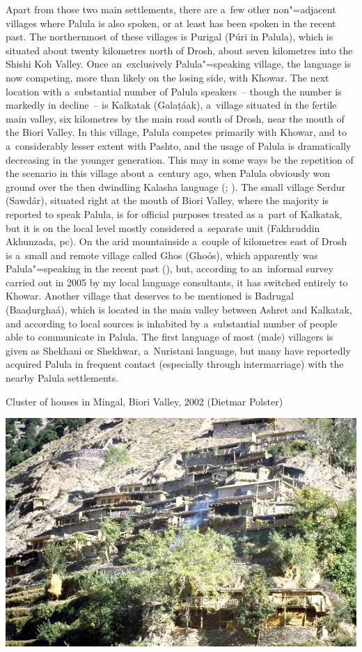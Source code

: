 Apart from those two main settlements, there are a~few other non"=adjacent villages where Palula is also spoken, or at least has been spoken in the recent past. The northernmost of these villages is Purigal (Púri in Palula), which is situated about twenty kilometres north of Drosh, about seven kilometres into the Shishi Koh Valley. Once an~exclusively Palula"=speaking village, the language is now competing, more than likely on the losing side, with Khowar. The next location with a~substantial number of Palula speakers~-- though the number is markedly in decline~-- is Kalkatak (Galaṭáak), a~village situated in the fertile main valley, six kilometres by the main road south of Drosh, near the mouth of the Biori Valley. In this village, Palula competes primarily with Khowar, and to a~considerably lesser extent with Pashto, and the usage of Palula is dramatically decreasing in the younger generation. This may in some ways be the repetition of the scenario in this village about a~century ago, when Palula obviously won ground over the then dwindling Kalasha language (\citealt[165]{decker1996}; \citealt[95]{cacopardo2001}). The small village Serdur (Sawdár), situated right at the mouth of Biori Valley, where the majority is reported to speak Palula, is for official purposes treated as a~part of Kalkatak, but it is on the local level mostly considered a~separate unit (Fakhruddin Akhunzada, pc). On the arid mountainside a~couple of kilometres east of Drosh is a~small and remote village called Ghos (Ghoós), which apparently was Palula"=speaking in the recent past (\citealt[75, 84]{decker1992a}), but, according to an~informal survey carried out in 2005 by my local language consultants, it has switched entirely to Khowar. Another village that deserves to be mentioned is Badrugal (Baaḍurghaá), which is located in the main valley between Ashret and Kalkatak, and according to local sources is inhabited by a~substantial number of people able to communicate in Palula. The first language of most (male) villagers is given as Shekhani or Shekhwar, a~Nuristani language, but many have reportedly acquired Palula in frequent contact (especially through intermarriage) with the nearby Palula settlements. 


\begin{photofigure}[t]
\caption{Cluster of houses in Mingal, Biori Valley, 2002 (Dietmar Polster)}
\includegraphics[width=\textwidth]{figures/ch1photo2.jpg}
\end{photofigure}


